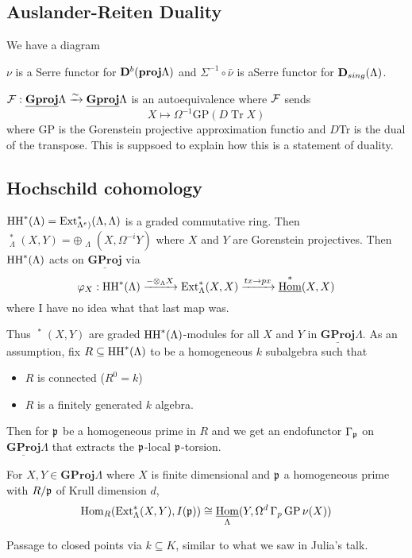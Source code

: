 \documentclass[12pt]{article}
\newcommand{\p}{\frakp}
\DeclareMathOperator{\uHom}{\underline{Hom}}
\begin{document}
\subsection{Auslander-Reiten Duality}
We have a diagram 
\begin{center}
\end{center}
\begin{thm}
	$\nu$ is a Serre functor for $\mathbf{D}^b(\mathbf{proj}\Lambda)$ and $\Sigma^{-1}\circ\bar\nu$ is aSerre functor for $\mathbf{D}_{sing}(\Lambda)$.
\end{thm}
\begin{rmk}
	$\mathcal{F}:\underline{\mathbf{Gproj}}\Lambda\xrightarrow{\sim}\underline{\mathbf{Gproj}}\Lambda$
	is an autoequivalence where $\mathcal{F}$ sends 
	\[X\mapsto \Omega^{-1}\text{GP}(D\operatorname{Tr}X)\]
	where GP is the Gorenstein projective approximation functio and $D$Tr is the dual of the transpose. This is suppsoed to explain 
	how this is a statement of duality.
\end{rmk}

\subsection{Hochschild cohomology}
$\operatorname{HH}^\ast(\Lambda)=\operatorname{Ext}^\ast_{\Lambda^e)}(\Lambda,\Lambda)$ is a graded commutative ring.
Then $\uHom_\Lambda^\ast(X,Y)=\oplus\uHom_\Lambda(X,\Omega^{-i}Y)$ where $X$ and $Y$ are Gorenstein projectives. Then $\operatorname{HH}^\ast(\Lambda)$ acts on $\underline{\mathbf{GProj}}$ 
via 
\[\varphi_X:\HH^\ast(\Lambda)\xrightarrow{-\otimes_\Lambda X}\Ext^\ast_\Lambda(X,X)\xrightarrow{tx\to px}\uHom^\ast(X,X)\]
where I have no idea what that last map was.

Thus $\uHom^\ast(X,Y)$ are graded $\operatorname{HH}^\ast(\Lambda)$-modules for all $X$ and $Y$ in $\underline{\mathbf{GProj}}\Lambda$. As an assumption, 
fix $R\subseteq\operatorname{HH}^\ast(\Lambda)$ to be a homogeneous $k$ subalgebra such that
\begin{itemize}
	\item $R$ is connected ($R^0=k$)
	\item $R$ is a finitely generated $k$ algebra.
\end{itemize}
Then for $\p$ be a homogeneous prime in $R$ and we get an endofunctor $\Gamma_\p$ on $\underline{\mathbf{GProj}}\Lambda$ that extracts the $\p$-local $\p$-torsion.
\begin{thm}[BIKP, '19]
	For $X,Y\in\mathbf{GProj}\Lambda$ where $X$ is finite dimensional and $\p$ a homogeneous prime with $R/\p$ of Krull dimension $d$,
	\[\Hom_R(\Ext_\Lambda^\ast(X,Y),I(\p))\cong\uHom_\Lambda(Y,\Omega^d\,\Gamma_p \,\text{GP}\,\nu(X))\]
\end{thm}
\begin{prf}
	Passage to closed points via $k\subseteq K$, similar to what we saw in Julia's talk.
\end{prf}
\end{document}
